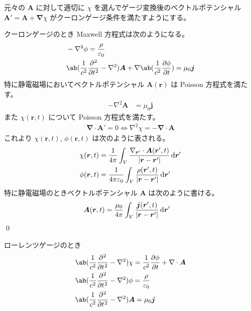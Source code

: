 \documentclass[uplatex,dvipdfmx,a4paper,11pt]{jlreq}
\makeatletter
\renewcommand{\AA}{\bm{A}}
\newcommand{\rr}{\bm{r}}
\newcommand{\vnabla}{\mathbf{\nabla}}
\newcommand{\laplacian}{\nabla^2}
\numberwithin{equation}{section}
\theoremstyle{definition}
\renewenvironment{proof}[1][\proofname]{\par
  \normalfont
  \topsep6\p@\@plus6\p@ \trivlist
  \item[\hskip\labelsep{\bfseries #1}\@addpunct{\bfseries}]\ignorespaces\quad\par
}{%
  \qed\endtrivlist\@endpefalse
}
\renewcommand\proofname{証明}
\makeatother
\begin{document}
\begin{proposition}
  元々の $\AA$ に対して適切に $\chi$ を選んでゲージ変換後のベクトルポテンシャル $\AA' = \AA + \vnabla\chi$ がクーロンゲージ条件を満たすようにする。
\end{proposition}
\begin{proof}
  クーロンゲージのとき Maxwell 方程式は次のようになる。
  \begin{align}
     & -\laplacian\phi = \frac{\rho}{\varepsilon_0}                                                              \\
     & \ab(\frac{1}{c^2}\diffp[2]{}{t} - \laplacian)\AA + \vnabla\ab(\frac{1}{c^2}\diffp{\phi}{t}) = \mu_0\bm{j}
  \end{align}
  特に静電磁場においてベクトルポテンシャル $\AA(\rr)$ は Poisson 方程式を満たす。
  \begin{align}
    -\laplacian\AA & = \mu_0\bm{j}
  \end{align}
  また $\chi(\rr, t)$ について Poisson 方程式を満たす。
  \begin{align}
    \vnabla\cdot\AA' = 0 \iff \laplacian\chi = -\vnabla\cdot\AA
  \end{align}
  これより $\chi(\rr, t)$, $\phi(\rr, t)$ は次のように表される。
  \begin{align}
    \chi(\rr, t) & = \frac{1}{4\pi}\int_V\frac{\vnabla_{\rr'}\cdot\AA(\rr', t)}{|\rr - \rr'|}\dl{\rr'} \\
    \phi(\rr, t) & = \frac{1}{4\pi\varepsilon_0}\int_V\frac{\rho(\rr', t)}{|\rr - \rr'|}\dl{\rr'}
  \end{align}
  特に静電磁場のときベクトルポテンシャル $\AA$ は次のように書ける。
  \begin{align}
    \AA(\rr, t) & = \frac{\mu_0}{4\pi}\int_V\frac{\bm{j}(\rr', t)}{|\rr - \rr'|}\dl{\rr'}
  \end{align}
\end{proof}

\begin{proposition}
  ローレンツゲージのとき
  \begin{align}
     & \ab(\frac{1}{c^2}\diffp[2]{}{t} - \laplacian)\chi = \frac{1}{c^2}\diffp{\phi}{t} + \vnabla\cdot\AA \\
     & \ab(\frac{1}{c^2}\diffp[2]{}{t} - \laplacian)\phi = \frac{\rho}{\varepsilon_0}                     \\
     & \ab(\frac{1}{c^2}\diffp[2]{}{t} - \laplacian)\AA = \mu_0\bm{j}
  \end{align}
\end{proposition}
\end{document}
